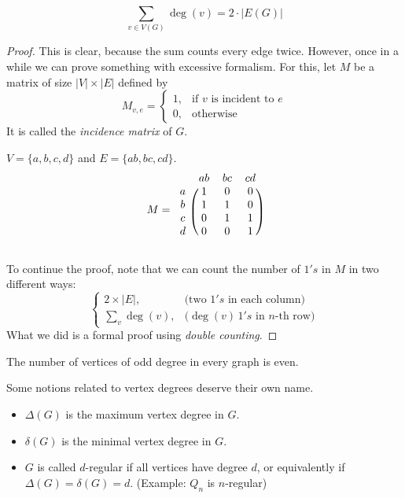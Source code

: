 \begin{lemma}
$$
\sum_{v\in V(G)} \deg(v)=2\cdot|E(G)|
$$
\end{lemma}
\begin{proof}
This is clear, because the sum counts every edge twice. However, once in a while we can prove something with excessive formalism. For this, let $M$ be a matrix of size $|V|\times |E|$ defined by
\[
    M_{v,e}= 
\begin{cases}
    1,  & \text{if $v$ is incident to $e$}\\
    0,  & \text{otherwise}
\end{cases}
\]
It is called the \emph{incidence matrix} of $G$.

\begin{example}
$V=\{a,b,c,d\}$ and $E=\{ab,bc,cd\}$.
\[
M=
\begin{blockarray}{cccc}
 & ab & bc & cd \\
\begin{block}{c(ccc)}
  a & 1 & 0 & 0\\
  b & 1 & 1 & 0\\
  c & 0 & 1 & 1\\
  d & 0 & 0 & 1\\
\end{block}
\end{blockarray}
 \]
\end{example}

To continue the proof, note that we can count the number of $1's$ in $M$ in two different ways:
\[
\begin{cases}
    2\times |E|,  & \text{(two $1's$ in each column)}\\
    \sum_{v}^{} \deg(v),  & \text{($\deg(v)\, 1's$ in $n$-th row)}
\end{cases}
\]
What we did is a formal proof using \emph{double counting}.
\end{proof}

\begin{corollary}
The number of vertices of odd degree in every graph is even.
\end{corollary}

Some notions related to vertex degrees deserve their own name.

\begin{itemize}
        \item $\Delta (G)$ is the maximum vertex degree in $G$.
        \item $\delta (G)$ is the minimal vertex degree in $G$.
        \item $G$ is called $d$-regular if all vertices have degree $d$, or equivalently if $\Delta(G)=\delta(G)=d$. (Example: $Q_n$ is $n$-regular)
\end{itemize}

